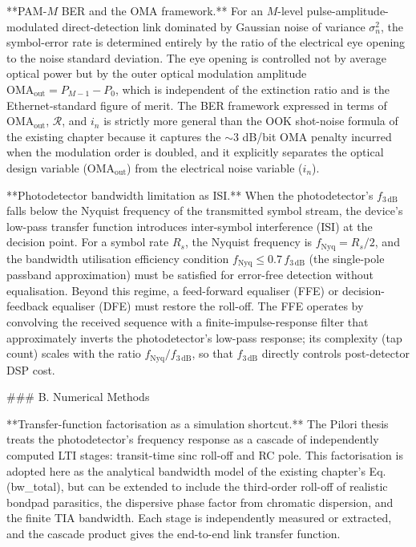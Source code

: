 **PAM-$M$ BER and the OMA framework.** For an $M$-level pulse-amplitude-modulated direct-detection link dominated by Gaussian noise of variance $\sigma_n^2$, the symbol-error rate is determined entirely by the ratio of the electrical eye opening to the noise standard deviation. The eye opening is controlled not by average optical power but by the outer optical modulation amplitude $\mathrm{OMA}_\mathrm{out} = P_{M-1} - P_0$, which is independent of the extinction ratio and is the Ethernet-standard figure of merit. The BER framework expressed in terms of $\mathrm{OMA}_\mathrm{out}$, $\mathcal{R}$, and $i_n$ is strictly more general than the OOK shot-noise formula of the existing chapter because it captures the $\sim 3$ dB/bit OMA penalty incurred when the modulation order is doubled, and it explicitly separates the optical design variable ($\mathrm{OMA}_\mathrm{out}$) from the electrical noise variable ($i_n$).

**Photodetector bandwidth limitation as ISI.** When the photodetector's $f_{3\,\mathrm{dB}}$ falls below the Nyquist frequency of the transmitted symbol stream, the device's low-pass transfer function introduces inter-symbol interference (ISI) at the decision point. For a symbol rate $R_s$, the Nyquist frequency is $f_\mathrm{Nyq} = R_s/2$, and the bandwidth utilisation efficiency condition $f_\mathrm{Nyq} \leq 0.7\,f_{3\,\mathrm{dB}}$ (the single-pole passband approximation) must be satisfied for error-free detection without equalisation. Beyond this regime, a feed-forward equaliser (FFE) or decision-feedback equaliser (DFE) must restore the roll-off. The FFE operates by convolving the received sequence with a finite-impulse-response filter that approximately inverts the photodetector's low-pass response; its complexity (tap count) scales with the ratio $f_\mathrm{Nyq}/f_{3\,\mathrm{dB}}$, so that $f_{3\,\mathrm{dB}}$ directly controls post-detector DSP cost.

### B. Numerical Methods

**Transfer-function factorisation as a simulation shortcut.** The Pilori thesis treats the photodetector's frequency response as a cascade of independently computed LTI stages: transit-time sinc roll-off and RC pole. This factorisation is adopted here as the analytical bandwidth model of the existing chapter's Eq. (bw\_total), but can be extended to include the third-order roll-off of realistic bondpad parasitics, the dispersive phase factor from chromatic dispersion, and the finite TIA bandwidth. Each stage is independently measured or extracted, and the cascade product gives the end-to-end link transfer function.

